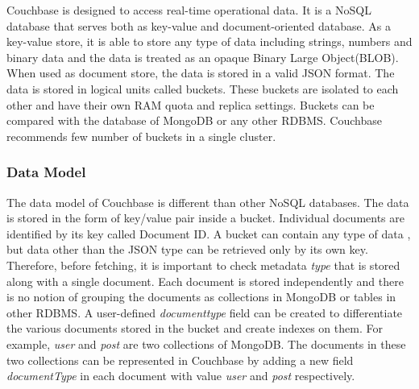  Couchbase is designed to access real-time operational data. It is a NoSQL database that serves both as key-value and document-oriented database. As a key-value store, it is able to store any type of data including  strings, numbers and binary data and the data is treated as an opaque Binary Large Object(BLOB). When used as document store, the data is stored in a valid JSON format. The data is stored in logical units called buckets. These buckets are isolated to each other and have their own RAM quota and replica settings. Buckets can be compared with the database of MongoDB or any other RDBMS. Couchbase recommends few number of buckets in a single cluster.
 
 \subsubsection{Data Model}%
 
The data model of Couchbase is different than other NoSQL databases. The data is stored in the form of key/value pair inside a bucket. Individual documents are identified by its key called Document ID. A bucket can contain any type of data , but data other than the JSON type can be retrieved only by its own key. Therefore, before fetching, it is important to check metadata \textit{type} that is stored along with a single document. Each document is stored independently and there is no notion of grouping the documents as collections in MongoDB or tables in other RDBMS. A user-defined \textit{documenttype} field can be created to differentiate the various documents stored in the bucket and  create indexes on them.  For example, \textit{user} and \textit{post} are two collections of MongoDB. The documents in these two collections can be represented in Couchbase by adding a new field \textit{documentType}  in each document with value \textit{user} and \textit{post} respectively. 

